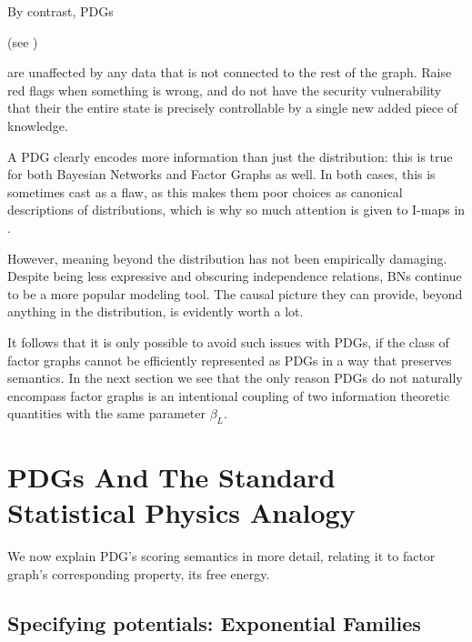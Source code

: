 \documentclass{article}
\theoremstyle{plain}
\theoremstyle{definition}
\theoremstyle{remark}
\numberwithin{equation}{section}
\begin{document}
	By contrast, PDGs
	\begin{vfull}
	(see )
	\end{vfull}
	are unaffected by any data that is not connected to the rest of the graph. Raise red flags when something is wrong, and do not have the security vulnerability that their the entire state is precisely controllable by a single new added piece of knowledge.
	\begin{vfull}
		A PDG clearly encodes more information than just the distribution: this is true for both Bayesian Networks and Factor Graphs as well. In both cases, this is sometimes cast as a flaw, as this makes them poor choices as canonical descriptions of distributions, which is why so much attention is given to I-maps in \cite{koller2009probabilistic}. 
		
		However, meaning beyond the distribution has not been empirically damaging. Despite being less expressive and obscuring independence relations, BNs continue to be a more popular modeling tool. The causal picture they can provide, beyond anything in the distribution, is evidently worth a lot.
	\end{vfull}
	It follows that it is only possible to avoid such issues with PDGs, if the class of factor graphs cannot be efficiently represented as PDGs in a way that preserves semantics.
	In the next section we see that the only reason PDGs do not naturally encompass factor graphs is an intentional coupling of two information theoretic quantities with the same parameter $\beta_L$. 
%

	\section{PDGs And The Standard Statistical Physics Analogy}
	We now explain PDG's scoring semantics in more detail, relating it to factor graph's corresponding property, its free energy.
	
	\subsection{Specifying potentials: Exponential
          Families}\label{sec:fg-expfam}
\end{document}
